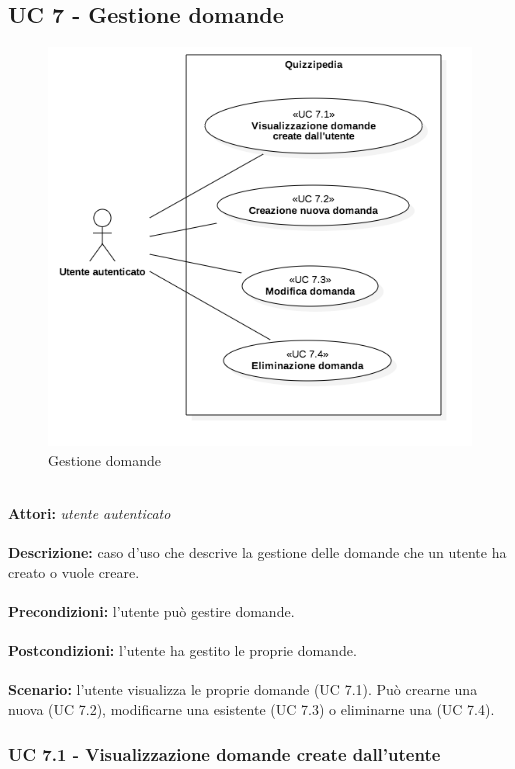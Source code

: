 \documentclass[a4paper,11pt]{article}
\begin{document}
\subsection{UC 7 - Gestione domande}

\begin{figure}[h!]
\centering
\includegraphics[scale=0.6]{../immagini/UC7.png}
\caption{Gestione domande}
\end{figure}
\ \\
\textbf{Attori:} \textit{utente autenticato}
\\ \\
\textbf{Descrizione:} caso d'uso che descrive la gestione delle domande che un utente ha creato o vuole creare.\\
\\
\textbf{Precondizioni:} l'utente può gestire domande.\\
\\
\textbf{Postcondizioni:} l’utente ha gestito le proprie domande.\\
\\
\textbf{Scenario:} l’utente visualizza le proprie domande (UC 7.1). Può crearne una nuova (UC 7.2), modificarne una esistente (UC 7.3) o eliminarne una (UC 7.4).\\


\subsubsection{UC 7.1 - Visualizzazione domande create dall'utente}
\end{document}
